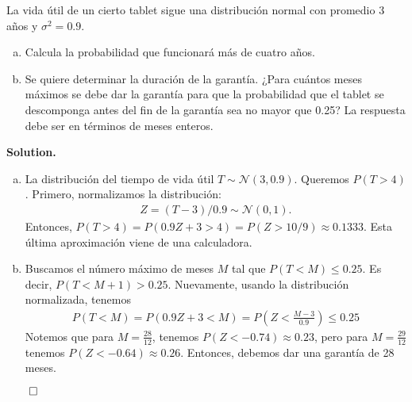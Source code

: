 \documentclass{article}
\theoremstyle{problemstyle}
\newenvironment{solution}{%
  \begin{mdframed}[linewidth=0.8pt,linecolor=Gray,backgroundcolor=Gray!5,roundcorner=5pt]%
  \noindent\textbf{Solution.}%
}{%
\hfill $ \qed $ 
  \end{mdframed}%
}
\begin{document}
\begin{problem}
La vida \'util de un cierto tablet sigue una distribuci\'on normal con promedio
3 a\~nos y $ \sigma^2 = 0.9$.
\begin{enumerate}[a)]
	\item Calcula la probabilidad que funcionar\'a m\'as de cuatro a\~nos.
	\item Se quiere determinar la duraci\'on de la garant\'ia. ¿Para cu\'antos
	      meses m\'aximos se debe dar la garant\'ia para que la probabilidad que el
	      tablet se descomponga antes del fin de la garant\'ia sea no mayor que 0.25?
	      La respuesta debe ser en t\'erminos de meses enteros.
\end{enumerate}
\end{problem}
\begin{solution}
	\begin{enumerate}[a)]
		\item La distribuci\'on del tiempo de vida \'util $ T\sim \mathcal N(3, 0.9) $. Queremos $ P(T>4) $. Primero, normalizamos la distribuci\'on:
		      \begin{align*}
			      Z = (T-3)/0.9\sim \mathcal N(0,1).
		      \end{align*}
		      Entonces, $ P(T>4) = P(0.9Z + 3 > 4) = P(Z > 10/9)\approx 0.1333 $. Esta \'ultima aproximaci\'on viene de una calculadora.
		\item Buscamos el n\'umero m\'aximo de meses $ M $ tal que $ P(T<M)\leq
			      0.25 $. Es decir, $ P(T<M+1) >0.25 $. Nuevamente, usando la
		      distribuci\'on normalizada, tenemos
		      \begin{align*}
			      P(T<M) = P(0.9Z+3<M) = P\left(Z < \frac{M-3}{0.9}\right) \leq 0.25
		      \end{align*}
		      Notemos que para $ M=\frac{28}{12} $, tenemos $ P(Z<-0.74) \approx 0.23 $, pero para $ M = \frac{29}{12} $ tenemos $ P(Z<-0.64)\approx 0.26 $. Entonces, debemos dar una garant\'ia de 28 meses.
	\end{enumerate}
\end{solution}
\end{document}
